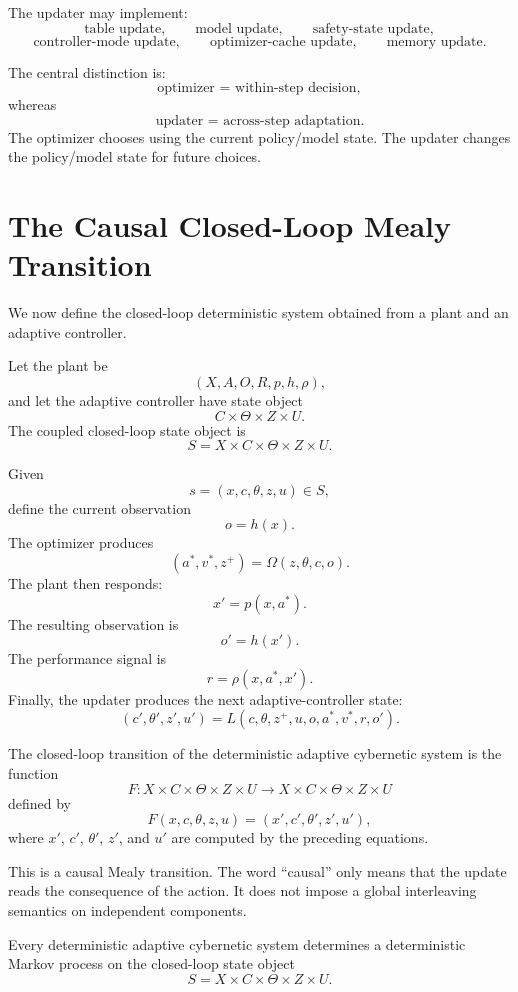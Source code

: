 The updater may implement:
\[
\text{table update},
\qquad
\text{model update},
\qquad
\text{safety-state update},
\]
\[
\text{controller-mode update},
\qquad
\text{optimizer-cache update},
\qquad
\text{memory update}.
\]

The central distinction is:
\[
\boxed{
\text{optimizer = within-step decision},
}
\]
whereas
\[
\boxed{
\text{updater = across-step adaptation}.
}
\]
The optimizer chooses using the current policy/model state.  The updater changes the policy/model
state for future choices.

\section{The Causal Closed-Loop Mealy Transition}
\label{sec:causal-closed-loop-transition}

We now define the closed-loop deterministic system obtained from a plant and an adaptive controller.

Let the plant be
\[
(X,A,O,R,p,h,\rho),
\]
and let the adaptive controller have state object
\[
C\times\Theta\times Z\times U.
\]
The coupled closed-loop state object is
\[
S=X\times C\times\Theta\times Z\times U.
\]

Given
\[
s=(x,c,\theta,z,u)\in S,
\]
define the current observation
\[
o=h(x).
\]
The optimizer produces
\[
(a^*,v^*,z^+)=\Omega(z,\theta,c,o).
\]
The plant then responds:
\[
x'=p(x,a^*).
\]
The resulting observation is
\[
o'=h(x').
\]
The performance signal is
\[
r=\rho(x,a^*,x').
\]
Finally, the updater produces the next adaptive-controller state:
\[
(c',\theta',z',u')
=
L(c,\theta,z^+,u,o,a^*,v^*,r,o').
\]

\begin{definition}
\label{def:closed-loop-transition}
The closed-loop transition of the deterministic adaptive cybernetic system is the function
\[
F:X\times C\times\Theta\times Z\times U
\longrightarrow
X\times C\times\Theta\times Z\times U
\]
defined by
\[
F(x,c,\theta,z,u)=(x',c',\theta',z',u'),
\]
where \(x'\), \(c'\), \(\theta'\), \(z'\), and \(u'\) are computed by the preceding equations.
\end{definition}

This is a causal Mealy transition.  The word ``causal'' only means that the update reads the
consequence of the action.  It does not impose a global interleaving semantics on independent
components.

\begin{theorem}
\label{thm:closed-loop-deterministic-markov}
Every deterministic adaptive cybernetic system determines a deterministic Markov process on the
closed-loop state object
\[
S=X\times C\times\Theta\times Z\times U.
\]
\end{theorem}

